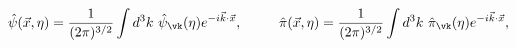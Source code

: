 \begin{equation}
\hat{\psi}(\vec{x},\eta) = \frac{1}{(2\pi)^{3/2} } \int d^3 k  ~\hat{\psi}_{\vk}(\eta) e^{- i \vec{k} \cdot \vec{x} },~~~~~~~~
 \hat{\pi}(\vec{x},\eta) = \frac{1}{ (2\pi)^{3/2} } \int d^3 k  ~\hat{\pi}_{\vk}(\eta) e^{- i \vec{k} \cdot \vec{x} },
\label{expansion}
\end{equation}

